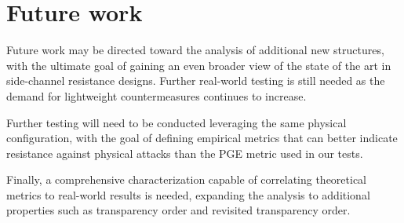 \newpage

\section{Future work}

    Future work may be directed toward the analysis of additional new \sbocs{} structures, with the ultimate goal of gaining an even broader view of the state of the art in side-channel resistance designs. Further real-world testing is still needed as the demand for lightweight countermeasures continues to increase.

    Further testing will need to be conducted leveraging the same physical configuration, with the goal of defining empirical metrics that can better indicate resistance against physical attacks than the PGE metric used in our tests.

    Finally, a comprehensive characterization capable of correlating theoretical metrics to real-world results is needed, expanding the analysis to additional properties such as transparency order and revisited transparency order.

% 